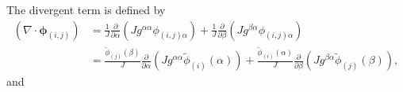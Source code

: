 \documentclass{article}
\newcommand{\vg}{\boldsymbol}
\newcommand{\pdiff}[2]{\frac{\partial #1}{\partial #2}}
\begin{document}
The divergent term is defined by
\begin{align}
(\nabla \cdot \vg{\phi}_{(i,j)}) &= \frac{1}{J} \pdiff{}{\alpha} \left( J g^{\alpha \alpha} \phi_{(i,j)\alpha} \right) + \frac{1}{J} \pdiff{}{\beta} \left( J g^{\beta \alpha} \phi_{(i,j)\alpha} \right) \\
&= \frac{\tilde{\phi}_{(j)}(\beta)}{J} \pdiff{}{\alpha} \left( J g^{\alpha \alpha} \tilde{\phi}_{(i)}(\alpha) \right)  + \frac{\tilde{\phi}_{(i)}(\alpha)}{J} \pdiff{}{\beta} \left( J g^{\beta \alpha} \tilde{\phi}_{(j)}(\beta) \right),
\end{align} and
\end{document}
